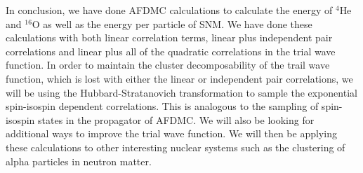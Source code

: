 In conclusion, we have done AFDMC calculations to calculate the energy of ${}^4$He and ${}^{16}$O as well as the energy per particle of SNM. We have done these calculations with both linear correlation terms, linear plus independent pair correlations and linear plus all of the quadratic correlations in the trial wave function. In order to maintain the cluster decomposability of the trail wave function, which is lost with either the linear or independent pair correlations, we will be using the Hubbard-Stratanovich transformation to sample the exponential spin-isospin dependent correlations. This is analogous to the sampling of spin-isospin states in the propagator of AFDMC. We will also be looking for additional ways to improve the trial wave function. We will then be applying these calculations to other interesting nuclear systems such as the clustering of alpha particles in neutron matter.
